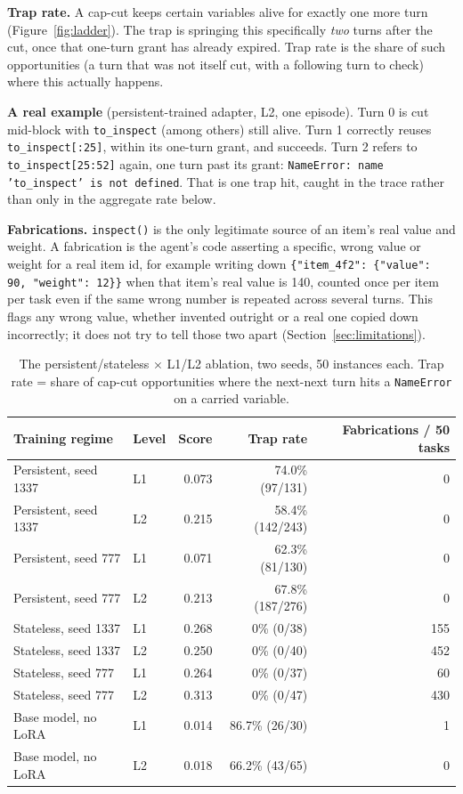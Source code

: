 \documentclass[11pt,a4paper]{article}
\newcommand{\cell}[1]{\textbf{#1}}
\begin{document}
\textbf{Trap rate.} A cap-cut keeps certain variables alive for exactly one more turn
(Figure~\ref{fig:ladder}). The trap is springing this specifically \emph{two} turns after the
cut, once that one-turn grant has already expired. Trap rate is the share of such opportunities
(a turn that was not itself cut, with a following turn to check) where this actually happens.

\begin{hyp}
\textbf{A real example} (persistent-trained adapter, L2, one episode). Turn 0 is cut mid-block
with \texttt{to\_inspect} (among others) still alive. Turn 1 correctly reuses
\texttt{to\_inspect[:25]}, within its one-turn grant, and succeeds. Turn 2 refers to
\texttt{to\_inspect[25:52]} again, one turn past its grant: \texttt{NameError: name
'to\_inspect' is not defined}. That is one trap hit, caught in the trace rather than only in the
aggregate rate below.
\end{hyp}

\textbf{Fabrications.} \texttt{inspect()} is the only legitimate source of an item's real value
and weight. A fabrication is the agent's code asserting a specific, wrong value or weight for a
real item id, for example writing down \texttt{\{"item\_4f2": \{"value": 90, "weight": 12\}\}}
when that item's real value is 140, counted once per item per task even if the same wrong number
is repeated across several turns. This flags any wrong value, whether invented outright or a
real one copied down incorrectly; it does not try to tell those two apart (Section~\ref{sec:limitations}).

\begin{table}[H]
\centering
\small
\begin{tabular}{@{}llrrr@{}}
\toprule
\cell{Training regime} & \cell{Level} & \cell{Score} & \cell{Trap rate} & \cell{Fabrications / 50 tasks} \\
\midrule
Persistent, seed 1337 & L1 & 0.073 & 74.0\% (97/131) & 0 \\
Persistent, seed 1337 & L2 & 0.215 & 58.4\% (142/243) & 0 \\
Persistent, seed 777  & L1 & 0.071 & 62.3\% (81/130)  & 0 \\
Persistent, seed 777  & L2 & 0.213 & 67.8\% (187/276) & 0 \\
Stateless, seed 1337  & L1 & 0.268 & 0\% (0/38)        & 155 \\
Stateless, seed 1337  & L2 & 0.250 & 0\% (0/40)        & 452 \\
Stateless, seed 777   & L1 & 0.264 & 0\% (0/37)        & 60 \\
Stateless, seed 777   & L2 & 0.313 & 0\% (0/47)        & 430 \\
\midrule
Base model, no LoRA & L1 & 0.014 & 86.7\% (26/30) & 1 \\
Base model, no LoRA & L2 & 0.018 & 66.2\% (43/65) & 0 \\
\bottomrule
\end{tabular}
\caption{The persistent/stateless $\times$ L1/L2 ablation, two seeds, 50 instances each. Trap
rate = share of cap-cut opportunities where the next-next turn hits a \texttt{NameError} on a
carried variable.}
\label{tab:mechanism}
\end{table}
\end{document}
